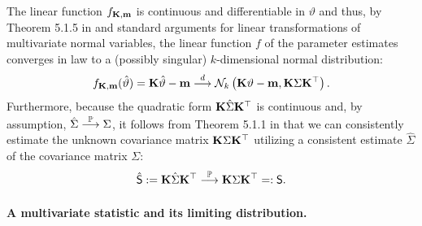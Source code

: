 \documentclass[12pt]{article}
\begin{document}
The linear function $f_{\mathbf{K}, \mathbf{m}}$ is continuous and differentiable in
$\vartheta$ and thus, by Theorem 5.1.5 in \cite{Lehmann1999} and
standard arguments for linear transformations of multivariate normal
variables,
the linear function $f$ of the parameter estimates
converges in law to a (possibly singular) $k$-dimensional normal
distribution:
\begin{eqnarray} \label{dist_f}
f_{\mathbf{K}, \mathbf{m}}(\hat{\vartheta}) = \mathbf{K} \hat{\vartheta} - \mathbf{m}
\stackrel{d}{\longrightarrow} \mathcal{N}_k\left(\mathbf{K} \vartheta - \mathbf{m}, \mathbf{K} \Sigma \mathbf{K}^\top\right).
\end{eqnarray}
Furthermore, because the quadratic form $\mathbf{K} \hat{\Sigma} \mathbf{K}^\top$
is continuous and, by assumption, $\hat{\Sigma} \stackrel{\mathbb{P}}{\longrightarrow} \Sigma$,
it follows from Theorem 5.1.1 in \cite{Lehmann1999} that we can
consistently estimate the unknown covariance matrix $\mathbf{K} \Sigma \mathbf{K}^\top$ utilizing
a consistent estimate $\hat{\Sigma}$ of the covariance matrix $\Sigma$:
\begin{eqnarray*}
\hat{\textsf{S}} := \mathbf{K} \hat{\Sigma} \mathbf{K}^\top \stackrel{\mathbb{P}}{\longrightarrow} \mathbf{K} \Sigma \mathbf{K}^\top =: \textsf{S}.
\end{eqnarray*}

\paragraph{A multivariate statistic and its limiting distribution.}
\end{document}

